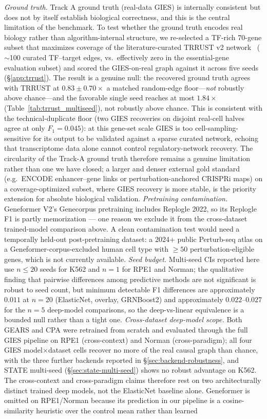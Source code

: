 \documentclass{article}
\theoremstyle{plain}
\theoremstyle{definition}
\theoremstyle{remark}
\begin{document}
\textit{Ground truth.} Track A ground truth (real-data GIES) is internally consistent but does not by itself establish biological correctness, and this is the central limitation of the benchmark. To test whether the ground truth encodes real biology rather than algorithm-internal structure, we re-selected a TF-rich 70-gene subset that maximizes coverage of the literature-curated TRRUST v2 network~\citep{han2018trrust} ($\sim$100 curated TF--target edges, vs.\ effectively zero in the essential-gene evaluation subset) and scored the GIES-on-real graph against it across five seeds (\S\ref{app:trrust}). The result is a genuine null: the recovered ground truth agrees with TRRUST at $0.83 \pm 0.70\times$ a matched random-edge floor---\emph{not} robustly above chance---and the favorable single seed reaches at most $1.84\times$ (Table~\ref{tab:trrust_multiseed}), not robustly above chance. This is consistent with the technical-duplicate floor (two GIES recoveries on disjoint real-cell halves agree at only $F_1 = 0.045$): at this gene-set scale GIES is too cell-sampling-sensitive for its output to be validated against a sparse curated network, echoing \citet{kernfeld2024fdr} that transcriptome data alone cannot control regulatory-network recovery. The circularity of the Track-A ground truth therefore remains a genuine limitation rather than one we have closed; a larger and denser external gold standard (e.g.\ ENCODE enhancer--gene links or perturbation-anchored CRISPRi maps) on a coverage-optimized subset, where GIES recovery is more stable, is the priority extension for absolute biological validation. \textit{Pretraining contamination.} Geneformer V2's Genecorpus pretraining includes Replogle 2022, so its Replogle F1 is partly memorization --- one reason we exclude it from the cross-dataset trained-model comparison above. A clean contamination test would need a temporally held-out post-pretraining dataset: a 2024+ public Perturb-seq atlas on a Geneformer-corpus-excluded human cell type with $\geq 50$ perturbation-eligible genes, which is not currently available. \textit{Seed budget.} Multi-seed CIs reported here use $n \leq 20$ seeds for K562 and $n=1$ for RPE1 and Norman; the qualitative finding that pairwise differences among predictive methods are not significant is robust to seed count, but minimum detectable F1 differences are approximately $0.011$ at $n=20$ (ElasticNet, overlay, GRNBoost2) and approximately $0.022$--$0.027$ for the $n=5$ deep-model comparisons, so the deep-vs-linear equivalence is a bounded null rather than a tight one. \textit{Cross-dataset deep-model scope.} Both GEARS and CPA were retrained from scratch and evaluated through the full GIES pipeline on RPE1 (cross-context) and Norman (cross-paradigm); all four GIES model$\times$dataset cells recover no more of the real causal graph than chance, with the three further backends reported in \S\ref{sec:backend-robustness}, and STATE multi-seed (\S\ref{sec:state-multi-seed}) shows no robust advantage on K562. The cross-context and cross-paradigm claims therefore rest on two architecturally distinct trained deep models, not the ElasticNet baseline alone. Geneformer is omitted on RPE1/Norman because its prediction in our pipeline is a cosine-similarity heuristic over the control mean rather than learned 
\end{document}
